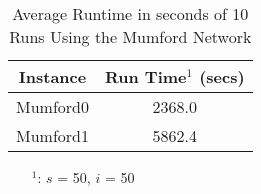 

\begin{table}[H]
    \centering
    \hspace*{-1.0cm}
    \begin{tabular}{|c|c|}
        \hline
        \textbf{Instance} & \textbf{Run Time$^1$ (secs)} \\
        \hline
        Mumford0 & 2368.0\\
        \hline
        Mumford1 & 5862.4\\
        \hline
    \end{tabular}
    \caption{Average Runtime in seconds of 10 Runs Using the Mumford Network}
    \label{tabel:runTimeMumford}
    \begin{itemize}[noitemsep]
    \item[$^1$:] $s$ = 50, $i$ = 50
    \end{itemize} 
\end{table}


